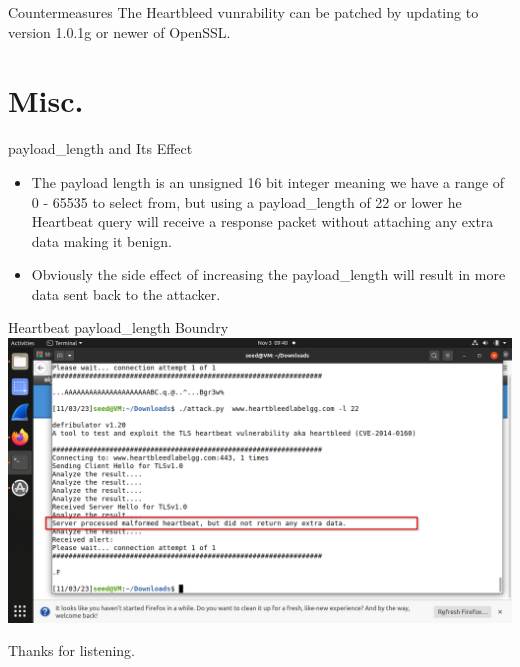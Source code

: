 \documentclass{beamer}
\begin{document}
  \begin{frame}{Countermeasures}
    The Heartbleed vunrability can be patched by updating to version 1.0.1g or newer of
    OpenSSL.
  \end{frame}

  \section{Misc.}
  \begin{frame}{payload\_length and Its Effect}
  \begin{itemize}
   \item
    The payload length is an unsigned 16 bit integer meaning we have a range of 0 - 65535
    to select from, but using a payload\_length of 22 or lower he Heartbeat query will
    receive a response packet without attaching any extra data making it benign.
   \item
   Obviously the side effect of increasing the payload\_length will result in more data
   sent back to the attacker.
  \end{itemize}
  \end{frame}

  \begin{frame}{Heartbeat payload\_length Boundry}
    \includegraphics[width=\textwidth]{heartbleed_boundry.png}
  \end{frame}

  \begin{frame}
  Thanks for listening.
  \end{frame}
\end{document}
